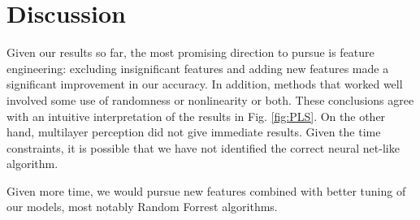 \documentclass[11pt]{article}
\begin{document}
\section{Discussion}
Given our results so far, the most promising direction to pursue is feature engineering: excluding insignificant features and adding new features made a significant improvement in our accuracy. In addition, methods that worked well involved some use of randomness or nonlinearity or both. These conclusions agree with an intuitive interpretation of the results in Fig. \ref{fig:PLS}. On the other hand, multilayer perception did not give immediate results. Given the time constraints, it is possible that we have not identified the correct neural net-like algorithm.

Given more time, we would pursue new features combined with better tuning of our models, most notably Random Forrest algorithms.
\end{document}
